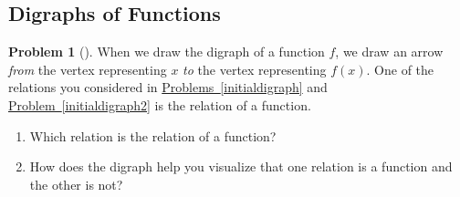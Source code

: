 \documentclass[10pt,]{book}
\theoremstyle{plain}
\theoremstyle{definition}
\newtheorem{activity}[project]{Problem}
\theoremstyle{definition}
\numberwithin{equation}{chapter}
\begin{document}
\subsection[{Digraphs of Functions}]{Digraphs of Functions}\label{digraphsoffunctions}
\begin{activity}[]\marginsymbol[-1em]{} \label{activity-336}
\hypertarget{p-1880}{}%
When we draw the digraph of a function \(f\), we draw an arrow \emph{from} the vertex representing \(x\) \emph{to} the vertex representing \(f(x)\).  One of the relations you considered in \hyperref[initialdigraph]{Problems~\ref{initialdigraph}} and \hyperref[initialdigraph2]{Problem~\ref{initialdigraph2}} is the relation of a function.%
\begin{enumerate}[font=\bfseries,label=(\alph*),ref=\alph*]
\item\label{task-244} \marginsymbol[-2.5em]{} \hypertarget{p-1881}{}%
Which relation is the relation of a function?%
\item\label{task-245} \marginsymbol[-2.5em]{} \hypertarget{p-1883}{}%
How does the digraph help you visualize that one relation is a function and the other is not?%
\end{enumerate}
\end{activity}
\end{document}
